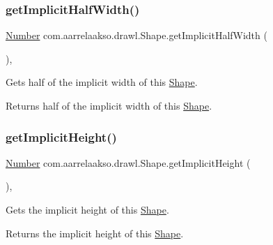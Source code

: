 \subsubsection{\texorpdfstring{get\+Implicit\+Half\+Width()}{getImplicitHalfWidth()}}
{\footnotesize\ttfamily \hyperlink{interfacecom_1_1aarrelaakso_1_1drawl_1_1_number}{Number} com.\+aarrelaakso.\+drawl.\+Shape.\+get\+Implicit\+Half\+Width (\begin{DoxyParamCaption}{ }\end{DoxyParamCaption})\hspace{0.3cm}{\ttfamily [protected]}, {\ttfamily [inherited]}}



Gets half of the implicit width of this \hyperlink{classcom_1_1aarrelaakso_1_1drawl_1_1_shape}{Shape}. 

\begin{DoxyReturn}{Returns}
half of the implicit width of this \hyperlink{classcom_1_1aarrelaakso_1_1drawl_1_1_shape}{Shape}. 
\end{DoxyReturn}
\mbox{\label{classcom_1_1aarrelaakso_1_1drawl_1_1_shape_a3b0ad73b41fe8c9ae66d20f7fc1de7c9}} 
\subsubsection{\texorpdfstring{get\+Implicit\+Height()}{getImplicitHeight()}}
{\footnotesize\ttfamily \hyperlink{interfacecom_1_1aarrelaakso_1_1drawl_1_1_number}{Number} com.\+aarrelaakso.\+drawl.\+Shape.\+get\+Implicit\+Height (\begin{DoxyParamCaption}{ }\end{DoxyParamCaption})\hspace{0.3cm}{\ttfamily [protected]}, {\ttfamily [inherited]}}



Gets the implicit height of this \hyperlink{classcom_1_1aarrelaakso_1_1drawl_1_1_shape}{Shape}. 

\begin{DoxyReturn}{Returns}
the implicit height of this \hyperlink{classcom_1_1aarrelaakso_1_1drawl_1_1_shape}{Shape}. 
\end{DoxyReturn}
\mbox{\label{classcom_1_1aarrelaakso_1_1drawl_1_1_shape_af8182545b3b1c85ecaee849474f63c6b}} 

